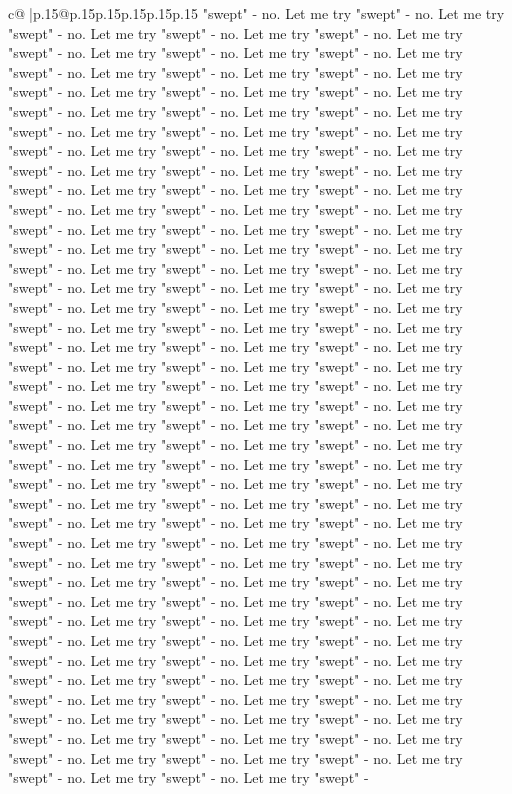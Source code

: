 \documentclass{article}
\begin{document}
{\begin{supertabular}{c@{$\;$}|p{.15\linewidth}@{}p{.15\linewidth}p{.15\linewidth}p{.15\linewidth}p{.15\linewidth}p{.15\linewidth}}
{{{"swept" {-} no. Let me try "swept" {-} no. Let me try "swept" {-} no. Let me try "swept" {-} no. Let me try "swept" {-} no. Let me try "swept" {-} no. Let me try "swept" {-} no. Let me try "swept" {-} no. Let me try "swept" {-} no. Let me try "swept" {-} no. Let me try "swept" {-} no. Let me try "swept" {-} no. Let me try "swept" {-} no. Let me try "swept" {-} no. Let me try "swept" {-} no. Let me try "swept" {-} no. Let me try "swept" {-} no. Let me try "swept" {-} no. Let me try "swept" {-} no. Let me try "swept" {-} no. Let me try "swept" {-} no. Let me try "swept" {-} no. Let me try "swept" {-} no. Let me try "swept" {-} no. Let me try "swept" {-} no. Let me try "swept" {-} no. Let me try "swept" {-} no. Let me try "swept" {-} no. Let me try "swept" {-} no. Let me try "swept" {-} no. Let me try "swept" {-} no. Let me try "swept" {-} no. Let me try "swept" {-} no. Let me try "swept" {-} no. Let me try "swept" {-} no. Let me try "swept" {-} no. Let me try "swept" {-} no. Let me try "swept" {-} no. Let me try "swept" {-} no. Let me try "swept" {-} no. Let me try "swept" {-} no. Let me try "swept" {-} no. Let me try "swept" {-} no. Let me try "swept" {-} no. Let me try "swept" {-} no. Let me try "swept" {-} no. Let me try "swept" {-} no. Let me try "swept" {-} no. Let me try "swept" {-} no. Let me try "swept" {-} no. Let me try "swept" {-} no. Let me try "swept" {-} no. Let me try "swept" {-} no. Let me try "swept" {-} no. Let me try "swept" {-} no. Let me try "swept" {-} no. Let me try "swept" {-} no. Let me try "swept" {-} no. Let me try "swept" {-} no. Let me try "swept" {-} no. Let me try "swept" {-} no. Let me try "swept" {-} no. Let me try "swept" {-} no. Let me try "swept" {-} no. Let me try "swept" {-} no. Let me try "swept" {-} no. Let me try "swept" {-} no. Let me try "swept" {-} no. Let me try "swept" {-} no. Let me try "swept" {-} no. Let me try "swept" {-} no. Let me try "swept" {-} no. Let me try "swept" {-} no. Let me try "swept" {-} no. Let me try "swept" {-} no. Let me try "swept" {-} no. Let me try "swept" {-} no. Let me try "swept" {-} no. Let me try "swept" {-} no. Let me try "swept" {-} no. Let me try "swept" {-} no. Let me try "swept" {-} no. Let me try "swept" {-} no. Let me try "swept" {-} no. Let me try "swept" {-} no. Let me try "swept" {-} no. Let me try "swept" {-} no. Let me try "swept" {-} no. Let me try "swept" {-} no. Let me try "swept" {-} no. Let me try "swept" {-} no. Let me try "swept" {-} no. Let me try "swept" {-} no. Let me try "swept" {-} no. Let me try "swept" {-} no. Let me try "swept" {-} no. Let me try "swept" {-} no. Let me try "swept" {-} no. Let me try "swept" {-} no. Let me try "swept" {-} no. Let me try "swept" {-} no. Let me try "swept" {-} no. Let me try "swept" {-} no. Let me try "swept" {-} no. Let me try "swept" {-} no. Let me try "swept" {-} no. Let me try "swept" {-} no. Let me try "swept" {-} no. Let me try "swept" {-} no. Let me try "swept" {-} no. Let me try "swept" {-} no. Let me try "swept" {-} no. Let me try "swept" {-} no. Let me try "swept" {-} no. Let me try "swept" {-} no. Let me try "swept" {-} no. Let me try "swept" {-} no. Let me try "swept" {-} no. Let me try "swept" {-} }}}
\end{supertabular}}
\end{document}
